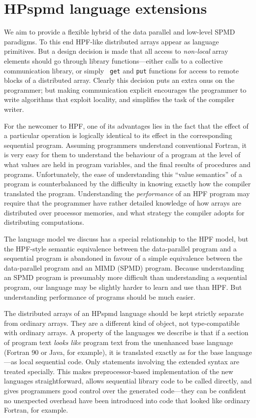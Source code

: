 \section{HPspmd language extensions}

We aim to provide a flexible hybrid of the data parallel and low-level
SPMD paradigms.  To this end HPF-like distributed arrays appear as
language primitives.  But a design decision is made that all access to {\em
non-local} array elements should go through library functions---either
calls to a collective communication library, or simply {\tt
get} and {\tt put} functions for access to remote blocks of a
distributed array.  Clearly this decision puts an extra onus on the
programmer; but making communication explicit encourages the programmer
to write algorithms that exploit locality, and simplifies the task of
the compiler writer.

For the newcomer to HPF, one of its advantages lies in the
fact that the effect of a particular operation is logically
identical to its effect in the corresponding sequential program.
Assuming programmers understand conventional Fortran,
it is very easy for them to understand the behaviour of a program
at the level of what values are held in program variables,
and the final results of procedures and programs.  Unfortunately, the
ease of understanding this ``value semantics'' of a program is
counterbalanced by the difficulty in knowing exactly how the compiler
translated the program.  Understanding the {\em performance} of an HPF
program may require that the programmer have rather detailed
knowledge of how arrays are distributed over processor memories,
and what strategy the compiler adopts for distributing computations.

The language model we discuss has a special relationship to the HPF
model, but the HPF-style semantic equivalence between the data-parallel
program and a sequential program is abandoned in favour of a simple
equivalence between the data-parallel program and an MIMD (SPMD) program.
Because understanding an SPMD program is presumably more difficult than
understanding a sequential program, our language may be slightly
harder to learn and use than HPF.  But understanding performance of
programs should be much easier.

The distributed arrays of an HPspmd language should be kept strictly
separate from ordinary arrays.  They are a different kind of object,
not type-compatible with ordinary arrays.  A property of the languages
we describe is that if a section of program text {\em looks like}
program text from the unenhanced base language (Fortran 90 or Java, for
example), it is translated exactly as for the base language---as local
sequential code.  Only statements involving the extended syntax are
treated specially.  This makes preprocessor-based implementation of the
new languages straightforward, allows sequential library code to be
called directly, and gives programmers good control over the generated
code---they can be confident no unexpected overhead have been
introduced into code that looked like ordinary Fortran, for example.


